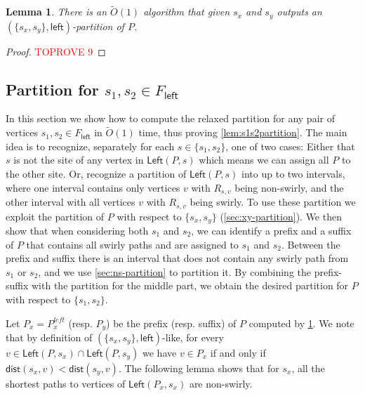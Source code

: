 \documentclass{article}
\newcommand{\Left}{\mathsf{Left}}
\newcommand{\leftside}{\mathsf{left}}
\newcommand{\dist}{\mathsf{dist}}
\newtheorem{lemma}{Lemma}
\newcommand{\Otild}{\tilde{O}}
\begin{document}
\begin{lemma}\label{lem:out_partition_xy}
    There is an $\Otild(1)$ algorithm that given $s_x$ and $s_y$ outputs an $(\{ s_x,s_y \},\leftside)$-partition of $P$.
\end{lemma}
\begin{proof}\textcolor{red}{TOPROVE 9}\end{proof}




\subsection{Partition for $s_1,s_2\in F_{\leftside}$}\label{sec:two-partition}

In this section we show how to compute the relaxed partition for any pair of vertices $s_1,s_2\in F_{\leftside}$ in $\Otild(1)$ time, thus proving \cref{lem:s1s2partition}.
The main idea is to recognize, separately for each $s\in \{s_1,s_2\}$, one of two cases: Either that $s$ is not the site of any vertex in $\Left(P,s)$ which means we can assign all $P$ to the other site.
Or, recognize a partition of $\Left(P,s)$ into up to two intervals, where one interval contains only vertices $v$ with $R_{s,v}$ being non-swirly, and the other interval with all vertices $v$ with $R_{s,v}$  being swirly.
To use these partition we exploit the partition of $P$ with respect to $\{s_x,s_y\}$ (\cref{sec:xy-partition}).
We then show that when considering both $s_1$ and $s_2$, we can identify a prefix and a suffix of $P$ that contains all swirly paths and are assigned to $s_1$ and $s_2$.
Between the prefix and suffix there is an interval that does not contain any swirly path from $s_1$ or $s_2$, and we use \cref{sec:ns-partition} to partition it.
By combining the prefix-suffix with the partition for the middle part, we obtain the desired partition for $P$ with respect to $\{s_1,s_2\}$.












Let $P_x=P^{left}_x$ (resp. $P_y$) be the prefix (resp. suffix) of $P$ computed by \cref{lem:out_partition_xy}.
We note that by definition of $(\{s_x,s_y\},\leftside)$-like, for every $v\in\Left(P,s_x)\cap\Left(P,s_y)$ we have $v\in P_x$ if and only if $\dist(s_x,v)<\dist(s_y,v)$.
The following lemma shows that for $s_x$, all the shortest paths to vertices of $\Left(P_x,s_x)$ are non-swirly.
\end{document}
